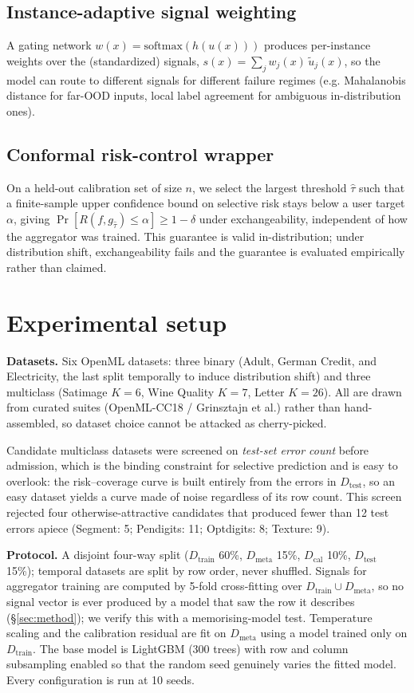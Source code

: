 \documentclass[conference]{IEEEtran}
\begin{document}
\subsection{Instance-adaptive signal weighting}
A gating network $w(x) = \mathrm{softmax}(h(u(x)))$ produces
per-instance weights over the (standardized) signals, $s(x) =
\sum_j w_j(x)\, \tilde u_j(x)$, so the model can route to different
signals for different failure regimes (e.g. Mahalanobis distance for
far-OOD inputs, local label agreement for ambiguous in-distribution ones).

\subsection{Conformal risk-control wrapper}
On a held-out calibration set of size $n$, we select the largest threshold
$\hat\tau$ such that a finite-sample upper confidence bound on selective
risk stays below a user target $\alpha$, giving
$\Pr[R(f, g_{\hat\tau}) \le \alpha] \ge 1-\delta$ under exchangeability,
independent of how the aggregator was trained. This guarantee is valid
in-distribution; under distribution shift, exchangeability fails and the
guarantee is evaluated empirically rather than claimed.

\section{Experimental setup}
\label{sec:setup}

\textbf{Datasets.} Six OpenML datasets: three binary (Adult, German
Credit, and Electricity, the last split temporally to induce distribution
shift) and three multiclass (Satimage $K{=}6$, Wine Quality $K{=}7$,
Letter $K{=}26$). All are drawn from curated suites (OpenML-CC18 /
Grinsztajn et al.) rather than hand-assembled, so dataset choice cannot be
attacked as cherry-picked.

Candidate multiclass datasets were screened on \emph{test-set error
count} before admission, which is the binding constraint for selective
prediction and is easy to overlook: the risk--coverage curve is built
entirely from the errors in $D_{\text{test}}$, so an easy dataset yields a
curve made of noise regardless of its row count. This screen rejected four
otherwise-attractive candidates that produced fewer than 12 test errors
apiece (Segment: 5; Pendigits: 11; Optdigits: 8; Texture: 9).

\textbf{Protocol.} A disjoint four-way split
($D_{\text{train}}$ 60\%, $D_{\text{meta}}$ 15\%, $D_{\text{cal}}$ 10\%,
$D_{\text{test}}$ 15\%); temporal datasets are split by row order, never
shuffled. Signals for aggregator training are computed by 5-fold
cross-fitting over $D_{\text{train}} \cup D_{\text{meta}}$, so no signal
vector is ever produced by a model that saw the row it describes
(\S\ref{sec:method}); we verify this with a memorising-model test.
Temperature scaling and the calibration residual are fit on
$D_{\text{meta}}$ using a model trained only on $D_{\text{train}}$. The
base model is LightGBM (300 trees) with row and column subsampling enabled
so that the random seed genuinely varies the fitted model. Every
configuration is run at 10 seeds.
\end{document}
